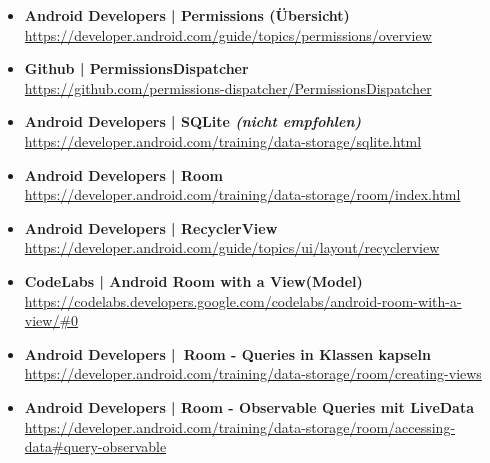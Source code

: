 \documentclass[a4paper]{article}
\begin{document}
		\begin{itemize}
			\item \textbf{Android Developers | Permissions (Übersicht)}\\
			\href{https://developer.android.com/guide/topics/permissions/overview}
			{https://developer.android.com/guide/topics/permissions/overview}
			
			\item \textbf{Github | PermissionsDispatcher}\\
			\href{https://github.com/permissions-dispatcher/PermissionsDispatcher}
			{https://github.com/permissions-dispatcher/PermissionsDispatcher}
			
			\item \textbf{Android Developers | SQLite \textit{(nicht empfohlen)}}\\
			\href{https://developer.android.com/training/data-storage/sqlite.html}
			{https://developer.android.com/training/data-storage/sqlite.html}
			
			\item \textbf{Android Developers | Room}\\
			\href{https://developer.android.com/training/data-storage/room/index.html}
			{https://developer.android.com/training/data-storage/room/index.html}
			
			\item \textbf{Android Developers | RecyclerView}\\
			\href{https://developer.android.com/guide/topics/ui/layout/recyclerview}
			{https://developer.android.com/guide/topics/ui/layout/recyclerview}
			
			\item \textbf{CodeLabs | Android Room with a View(Model)}\\
			\href{https://codelabs.developers.google.com/codelabs/android-room-with-a-view/#0}
			{https://codelabs.developers.google.com/codelabs/android-room-with-a-view/\#0}
			
			\item \textbf{Android Developers | Room - Queries in Klassen kapseln}\\
			\href{https://developer.android.com/training/data-storage/room/creating-views}
			{https://developer.android.com/training/data-storage/room/creating-views}
			
			\item \textbf{Android Developers | Room - Observable Queries mit LiveData}\\
			\href{https://developer.android.com/training/data-storage/room/accessing-data#query-observable}
			{https://developer.android.com/training/data-storage/room/accessing-data\#query-observable}
			

\end{itemize}
\end{document}
